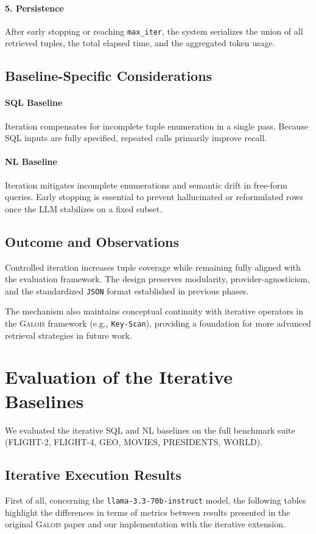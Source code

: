 \paragraph{5. Persistence}
After early stopping or reaching \texttt{max\_iter}, the system serializes the union of all retrieved tuples, the total elapsed time, and the aggregated token usage.

\subsection{Baseline-Specific Considerations}

\paragraph{SQL Baseline}
Iteration compensates for incomplete tuple enumeration in a single pass. Because SQL inputs are fully specified, repeated calls primarily improve recall.

\paragraph{NL Baseline}
Iteration mitigates incomplete enumerations and semantic drift in free-form queries. Early stopping is essential to prevent hallucinated or reformulated rows once the LLM stabilizes on a fixed subset.

\subsection{Outcome and Observations}

Controlled iteration increases tuple coverage while remaining fully aligned with the evaluation framework. The design preserves modularity, provider-agnosticism, and the standardized \texttt{JSON} format established in previous phases.

The mechanism also maintains conceptual continuity with iterative operators in the \textsc{Galois} framework (e.g., \texttt{Key-Scan}), providing a foundation for more advanced retrieval strategies in future work.

\section{Evaluation of the Iterative Baselines}
We evaluated the iterative SQL and NL baselines on the full benchmark suite (FLIGHT-2, FLIGHT-4, GEO, MOVIES, PRESIDENTS, WORLD).

\subsection{Iterative Execution Results}
First of all, concerning the \texttt{llama-3.3-70b-instruct} model, the following tables highlight the differences in terms of metrics between results presented in the original \textsc{Galois} paper and our implementation with the iterative extension.

